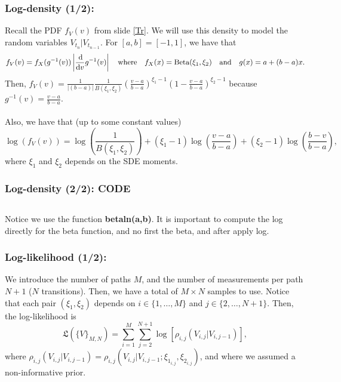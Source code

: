 \documentclass[aspectratio=169]{beamer}\usepackage[utf8]{inputenc}
\begin{document}
\begin{frame}\frametitle{Log-density (1/2):}

Recall the PDF $f_V(v)$ from slide {\color{blue}\ref{Tr}}. We will use this density to model the random variables $V_{t_n}|V_{t_{n-1}}$. For $[a,b]=[-1,1]$, we have that
\begin{equation*}
f_V(v)=f_X(g^{-1}(v))\left|\frac{\dif}{\dif v}g^{-1}(v)\right|\quad \text{where}\quad f_X(x)=\text{Beta}(\xi_1,\xi_2)\quad\text{and}\quad g(x)=a+(b-a)x.
\end{equation*}
Then, $f_V(v)=\frac{1}{|(b-a)|}\frac{1}{B(\xi_1,\xi_2)}\left(\frac{v-a}{b-a}\right)^{\xi_1-1}\left(1-\frac{v-a}{b-a}\right)^{\xi_2-1}$ because $g^{-1}(v)=\frac{v-a}{b-a}$.\\
\quad\\
Also, we have that (up to some constant values)
\begin{equation*}
\log\left(f_V(v)\right)=\log\left(\frac{1}{B(\xi_1,\xi_2)}\right)+(\xi_1-1)\log\left(\frac{v-a}{b-a}\right)+(\xi_2-1)\log\left(\frac{b-v}{b-a}\right),
\end{equation*}
where $\xi_1$ and $\xi_2$ depends on the SDE moments.

\end{frame}


\begin{frame}\frametitle{Log-density (2/2): CODE}

\begin{center}
\begin{tabular}{|c|}
\toprule
{\footnotesize

}\\
\bottomrule
\end{tabular}
\end{center}
Notice we use the function \textbf{betaln(a,b)}. It is important to compute the log directly for the beta function, and no first the beta, and after apply log.
\end{frame}


\begin{frame}\frametitle{Log-likelihood (1/2):}

We introduce the number of paths $M$, and the number of measurements per path $N+1$ ($N$ transitions). Then, we have a total of $M\times N$ samples to use. Notice that each pair $(\xi_1,\xi_2)$ depends on $i\in\{1,\dots,M\}$ and $j\in\{2,\dots,N+1\}$. Then, the log-likelihood is
\begin{equation*}
\mathfrak{L}\left(\{V\}_{M,N}\right)=\sum_{i=1}^M\sum_{j=2}^{N+1}\log\left[\rho_{i,j}\left(V_{i,j}|V_{i,j-1}\right)\right],
\end{equation*}
where $\rho_{i,j}\left(V_{i,j}|V_{i,j-1}\right)=\rho_{i,j}\left(V_{i,j}|V_{i,j-1};\xi_{1_{i,j}},\xi_{2_{i,j}}\right)$, and where we assumed a non-informative prior.

\end{frame}
\end{document}
